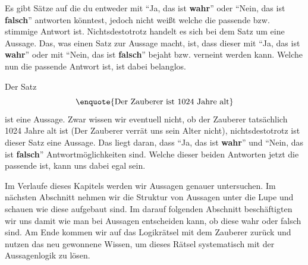 \documentclass[../../main.tex]{subfiles}
\begin{document}
    Es gibt Sätze auf die du entweder mit \enquote{Ja, das ist \textbf{wahr}} oder \enquote{Nein, das ist \textbf{falsch}} antworten könntest, jedoch nicht weißt welche die passende bzw. stimmige Antwort ist. Nichtsdestotrotz handelt es sich bei dem Satz um eine Aussage. Das, was einen Satz zur Aussage macht, ist, dass dieser mit \enquote{Ja, das ist \textbf{wahr}} oder mit \enquote{Nein, das ist \textbf{falsch}} bejaht bzw. verneint werden kann. Welche nun die passende Antwort ist, ist dabei belanglos.
   
   \begin{example}{}
        Der Satz 
        \[\textrm{\enquote{Der Zauberer ist 1024 Jahre alt}}\]
        ist eine Aussage. Zwar wissen wir eventuell nicht, ob der Zauberer tatsächlich 1024 Jahre alt ist (Der Zauberer verrät uns sein Alter nicht), nichtsdestotrotz ist dieser Satz eine Aussage. Das liegt daran, dass \enquote{Ja, das ist \textbf{wahr}} und  \enquote{Nein, das ist \textbf{falsch}} Antwortmöglichkeiten sind. Welche dieser beiden Antworten jetzt die passende ist, kann uns dabei egal sein.
   \end{example}

    Im Verlaufe dieses Kapitels werden wir Aussagen genauer untersuchen. Im nächsten Abschnitt nehmen wir die Struktur von Aussagen unter die Lupe und schauen wie diese aufgebaut sind. Im darauf folgenden Abschnitt beschäftigten wir uns damit wie man bei Aussagen entscheiden kann, ob diese wahr oder falsch sind. Am Ende kommen wir auf das Logikrätsel mit dem Zauberer zurück und nutzen das neu gewonnene Wissen, um dieses Rätsel systematisch mit der Aussagenlogik zu lösen.

    
        
\end{document}
